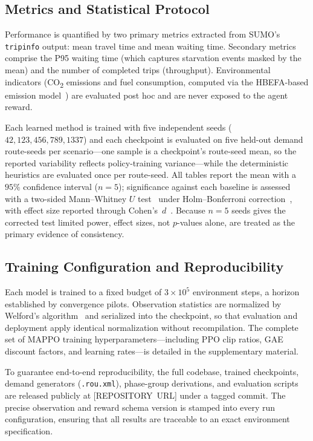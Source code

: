 \subsection{Metrics and Statistical Protocol}
\label{sec:metrics}
Performance is quantified by two primary metrics extracted from SUMO's \texttt{tripinfo}
output: mean travel time and mean waiting time. Secondary metrics comprise the P95 waiting
time (which captures starvation events masked by the mean) and the number of completed
trips (throughput). Environmental indicators
(CO\textsubscript{2} emissions and fuel consumption, computed via the HBEFA-based emission
model~\cite{krajzewicz2015_emissions}) are evaluated post hoc and are never exposed to the
agent reward.

Each learned method is trained with five independent seeds ($42, 123, 456, 789, 1337$)
and each checkpoint is evaluated on five held-out demand route-seeds per scenario---one
sample is a checkpoint's route-seed mean, so the reported variability reflects
policy-training variance---while the deterministic heuristics are evaluated once per
route-seed. All tables report the mean with a $95\%$ confidence interval ($n = 5$);
significance against each baseline is assessed with a two-sided Mann--Whitney $U$
test~\cite{mann1947_mwu} under Holm--Bonferroni correction~\cite{holm1979}, with effect
size reported through Cohen's~$d$~\cite{cohen1988}. Because $n = 5$ seeds gives the
corrected test limited power, effect sizes, not $p$-values alone, are treated as the
primary evidence of consistency.

\subsection{Training Configuration and Reproducibility}
\label{sec:training}
Each model is trained to a fixed budget of $3 \times 10^{5}$ environment steps, a
horizon established by convergence pilots. Observation statistics are normalized by
Welford's algorithm~\cite{welford1962} and serialized into the checkpoint, so that
evaluation and deployment apply identical normalization without recompilation. The complete
set of MAPPO training hyperparameters---including PPO clip ratios, GAE discount factors, and
learning rates---is detailed in the supplementary material.

To guarantee end-to-end reproducibility, the full codebase, trained checkpoints,
demand generators (\texttt{.rou.xml}), phase-group derivations, and evaluation scripts are
released publicly at \mbox{[REPOSITORY~URL]} under a tagged commit. The precise observation
and reward schema version is stamped into every run configuration, ensuring that all
results are traceable to an exact environment specification.

